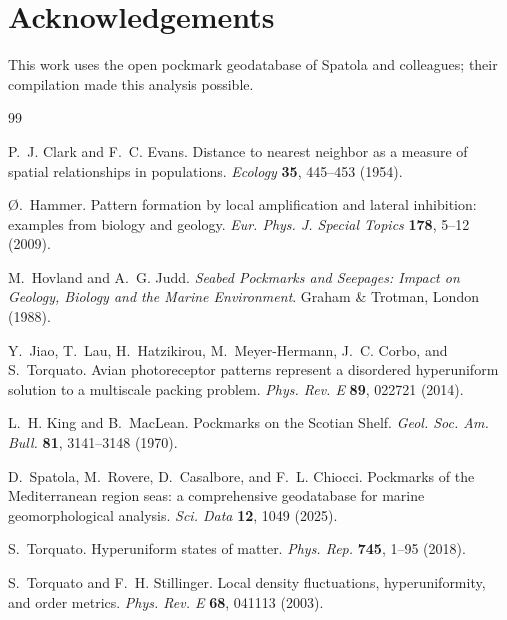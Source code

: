 \documentclass[11pt]{article}
\begin{document}
\section*{Acknowledgements}
This work uses the open pockmark geodatabase of Spatola and colleagues; their
compilation made this analysis possible.

\begin{thebibliography}{99}

P.~J. Clark and F.~C. Evans.
Distance to nearest neighbor as a measure of spatial relationships in
populations. \textit{Ecology} \textbf{35}, 445--453 (1954).

\O.~Hammer.
Pattern formation by local amplification and lateral inhibition: examples from
biology and geology.
\textit{Eur. Phys. J. Special Topics} \textbf{178}, 5--12 (2009).

M.~Hovland and A.~G. Judd.
\textit{Seabed Pockmarks and Seepages: Impact on Geology, Biology and the Marine
Environment}. Graham \& Trotman, London (1988).

Y.~Jiao, T.~Lau, H.~Hatzikirou, M.~Meyer-Hermann, J.~C. Corbo, and S.~Torquato.
Avian photoreceptor patterns represent a disordered hyperuniform solution to a
multiscale packing problem. \textit{Phys. Rev. E} \textbf{89}, 022721 (2014).

L.~H. King and B.~MacLean.
Pockmarks on the Scotian Shelf.
\textit{Geol. Soc. Am. Bull.} \textbf{81}, 3141--3148 (1970).

D.~Spatola, M.~Rovere, D.~Casalbore, and F.~L. Chiocci.
Pockmarks of the Mediterranean region seas: a comprehensive geodatabase for
marine geomorphological analysis. \textit{Sci. Data} \textbf{12}, 1049 (2025).

S.~Torquato.
Hyperuniform states of matter.
\textit{Phys. Rep.} \textbf{745}, 1--95 (2018).

S.~Torquato and F.~H. Stillinger.
Local density fluctuations, hyperuniformity, and order metrics.
\textit{Phys. Rev. E} \textbf{68}, 041113 (2003).

\end{thebibliography}
\end{document}
